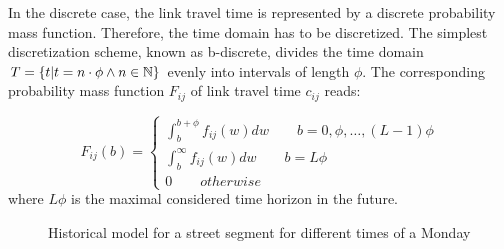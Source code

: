 In the discrete case, the link travel time is represented by a discrete probability mass function. Therefore, the time domain has to be discretized. The simplest discretization scheme, known as b-discrete, divides the time domain $T = \{t | t = n\cdot \phi \wedge n \in \mathbb{N} \}$ evenly into intervals of length $\phi$. The corresponding probability mass function $F_{ij}$ of link travel time $c_{ij}$ reads:

\begin{equation}
	F_{ij}(b) = \begin{cases}\int_b^{b+\phi}f_{ij}(w)dw \qquad b =
	0,\phi,\ldots, (L-1)\phi\\
	\int_b^{\infty}f_{ij}(w)dw \qquad b =
	L \phi\\
	0 \qquad otherwise
	\end{cases} 
\end{equation}
where $L \phi$ is the maximal considered time horizon in the future.

\begin{figure}
    \centering
    \caption{Historical model for a street segment for different times of a
    Monday}\label{fig:ltt}
\end{figure}

